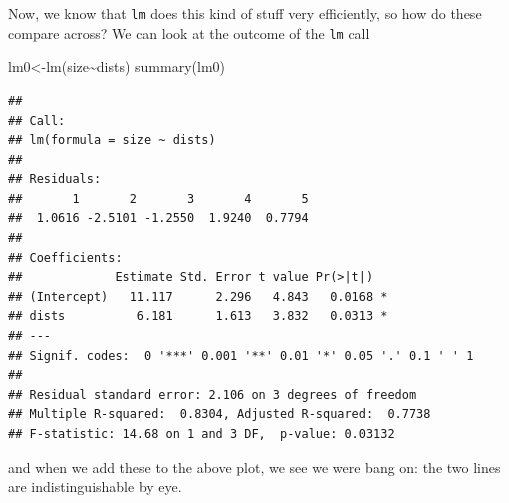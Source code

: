 \documentclass[
]{book}
\newenvironment{Shaded}{\begin{snugshade}}{\end{snugshade}}
\newcommand{\AttributeTok}[1]{\textcolor[rgb]{0.77,0.63,0.00}{#1}}
\newcommand{\DecValTok}[1]{\textcolor[rgb]{0.00,0.00,0.81}{#1}}
\newcommand{\FunctionTok}[1]{\textcolor[rgb]{0.00,0.00,0.00}{#1}}
\newcommand{\NormalTok}[1]{#1}
\newcommand{\OtherTok}[1]{\textcolor[rgb]{0.56,0.35,0.01}{#1}}
\newcommand{\SpecialCharTok}[1]{\textcolor[rgb]{0.00,0.00,0.00}{#1}}
\newcommand{\StringTok}[1]{\textcolor[rgb]{0.31,0.60,0.02}{#1}}
\begin{document}
Now, we know that \texttt{lm} does this kind of stuff very efficiently, so how do these compare across? We can look at the outcome of the \texttt{lm} call

\begin{Shaded}
\begin{Highlighting}[]
\NormalTok{lm0}\OtherTok{\textless{}{-}}\FunctionTok{lm}\NormalTok{(size}\SpecialCharTok{\textasciitilde{}}\NormalTok{dists)}
\FunctionTok{summary}\NormalTok{(lm0)}
\end{Highlighting}
\end{Shaded}

\begin{verbatim}
## 
## Call:
## lm(formula = size ~ dists)
## 
## Residuals:
##       1       2       3       4       5 
##  1.0616 -2.5101 -1.2550  1.9240  0.7794 
## 
## Coefficients:
##             Estimate Std. Error t value Pr(>|t|)  
## (Intercept)   11.117      2.296   4.843   0.0168 *
## dists          6.181      1.613   3.832   0.0313 *
## ---
## Signif. codes:  0 '***' 0.001 '**' 0.01 '*' 0.05 '.' 0.1 ' ' 1
## 
## Residual standard error: 2.106 on 3 degrees of freedom
## Multiple R-squared:  0.8304, Adjusted R-squared:  0.7738 
## F-statistic: 14.68 on 1 and 3 DF,  p-value: 0.03132
\end{verbatim}

and when we add these to the above plot, we see we were bang on: the two lines are indistinguishable by eye.

\begin{Shaded}
\end{Shaded}
\end{document}
